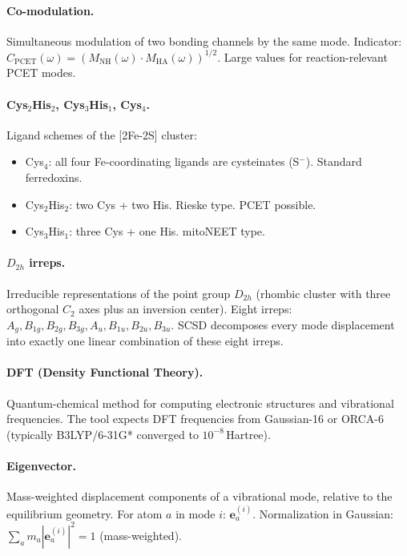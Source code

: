 \documentclass[11pt,a4paper,twoside]{article}
\theoremstyle{remark}
\begin{document}
\paragraph{Co-modulation.}
Simultaneous modulation of two bonding channels by the same mode.
Indicator: $C_\text{PCET}(\omega) = (M_\text{NH}(\omega) \cdot
M_\text{HA}(\omega))^{1/2}$. Large values for reaction-relevant
PCET modes.

\paragraph{Cys$_2$His$_2$, Cys$_3$His$_1$, Cys$_4$.}
Ligand schemes of the [2Fe-2S] cluster:
\begin{itemize}\setlength{\itemsep}{0pt}
  \item Cys$_4$: all four Fe-coordinating ligands are cysteinates
        (S$^-$). Standard ferredoxins.
  \item Cys$_2$His$_2$: two Cys + two His. Rieske type. PCET
        possible.
  \item Cys$_3$His$_1$: three Cys + one His. mitoNEET type.
\end{itemize}

\paragraph{$D_{2h}$ irreps.}
Irreducible representations of the point group $D_{2h}$ (rhombic
cluster with three orthogonal $C_2$ axes plus an inversion center).
Eight irreps: $A_g, B_{1g}, B_{2g}, B_{3g}, A_u, B_{1u}, B_{2u},
B_{3u}$. SCSD decomposes every mode displacement into exactly one
linear combination of these eight irreps.

\paragraph{DFT (Density Functional Theory).}
Quantum-chemical method for computing electronic structures and
vibrational frequencies. The tool expects DFT frequencies from
Gaussian-16 or ORCA-6 (typically B3LYP/6-31G* converged to
$10^{-8}$\,Hartree).

\paragraph{Eigenvector.}
Mass-weighted displacement components of a vibrational mode,
relative to the equilibrium geometry. For atom $a$ in mode $i$:
$\mathbf{e}_a^{(i)}$. Normalization in Gaussian: $\sum_a m_a
|\mathbf{e}_a^{(i)}|^2 = 1$ (mass-weighted).
\end{document}
